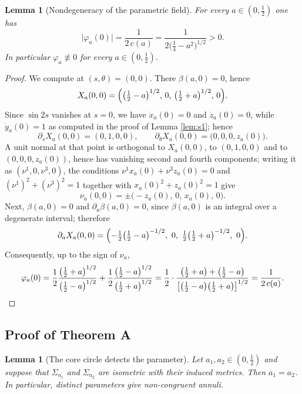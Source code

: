 \documentclass[10pt,a4paper]{amsart}
\newtheorem{lemma}[theorem]{Lemma}
\begin{document}
\begin{lemma}[Nondegeneracy of the parametric field]\label{lem:phinonzero}
For every $a\in(0,\tfrac12)$ one has
\[
\bigl|\varphi_a(0)\bigr|=\frac{1}{2\,c(a)}=\frac{1}{2\bigl(\tfrac14-a^2\bigr)^{1/2}}>0 .
\]
In particular $\varphi_a\not\equiv 0$ for every $a\in(0,\tfrac12)$.
\end{lemma}

\begin{proof}
We compute at $(s,\theta)=(0,0)$. There $\beta(a,0)=0$, hence
\[
X_a(0,0)=\Bigl(\bigl(\tfrac12-a\bigr)^{1/2},\,0,\,\bigl(\tfrac12+a\bigr)^{1/2},\,0\Bigr).
\]
Since $\sin 2s$ vanishes at $s=0$, we have $\dot x_a(0)=0$ and $\dot z_a(0)=0$, while $\dot y_a(0)=1$ as computed in the proof of Lemma \ref{lem:s1}; hence
\[
\partial_sX_a(0,0)=(0,1,0,0),\qquad \partial_\theta X_a(0,0)=\bigl(0,0,0,z_a(0)\bigr).
\]
A unit normal at that point is orthogonal to $X_a(0,0)$, to $(0,1,0,0)$ and to $(0,0,0,z_a(0))$, hence has vanishing second and fourth components; writing it as $(\nu^1,0,\nu^3,0)$, the conditions $\nu^1x_a(0)+\nu^3z_a(0)=0$ and $(\nu^1)^2+(\nu^3)^2=1$ together with $x_a(0)^2+z_a(0)^2=1$ give
\[
\nu_a(0,0)=\pm\bigl(-z_a(0),\,0,\,x_a(0),\,0\bigr).
\]
Next, $\beta(a,0)=0$ and $\partial_a\beta(a,0)=0$, since $\beta(a,0)$ is an integral over a degenerate interval; therefore
\[
\partial_aX_a(0,0)=\Bigl(-\tfrac12\bigl(\tfrac12-a\bigr)^{-1/2},\ 0,\ \tfrac12\bigl(\tfrac12+a\bigr)^{-1/2},\ 0\Bigr).
\]
Consequently, up to the sign of $\nu_a$,
\[
\varphi_a(0)=\frac{1}{2}\frac{\bigl(\tfrac12+a\bigr)^{1/2}}{\bigl(\tfrac12-a\bigr)^{1/2}}+\frac{1}{2}\frac{\bigl(\tfrac12-a\bigr)^{1/2}}{\bigl(\tfrac12+a\bigr)^{1/2}}
=\frac{1}{2}\cdot\frac{\bigl(\tfrac12+a\bigr)+\bigl(\tfrac12-a\bigr)}{\bigl[\bigl(\tfrac12-a\bigr)\bigl(\tfrac12+a\bigr)\bigr]^{1/2}}=\frac{1}{2\,c(a)} .\qedhere
\]
\end{proof}

\subsection*{Proof of Theorem A}

\begin{lemma}[The core circle detects the parameter]\label{lem:core}
Let $a_1,a_2\in(0,\tfrac12)$ and suppose that $\Sigma_{a_1}$ and $\Sigma_{a_2}$ are isometric with their induced metrics. Then $a_1=a_2$. In particular, distinct parameters give non-congruent annuli.
\end{lemma}
\end{document}

